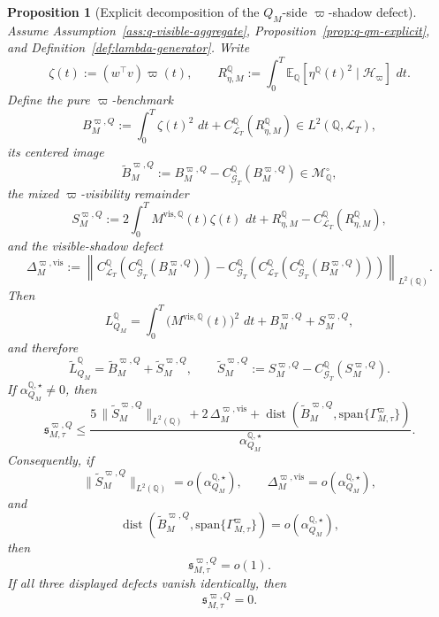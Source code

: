 \documentclass[11pt,a4paper]{amsart}
\theoremstyle{plain}
\newtheorem{proposition}[theorem]{Proposition}
\theoremstyle{definition}
\theoremstyle{remark}
\DeclareMathOperator{\dist}{dist}
\newcommand{\QQ}{\mathbb{Q}}
\newcommand{\EE}{\mathbb{E}}
\newcommand{\cG}{\mathcal{G}}
\newcommand{\cH}{\mathcal{H}}
\newcommand{\cL}{\mathcal{L}}
\newcommand{\cM}{\mathcal{M}}
\newcommand{\dd}{\,d}
\begin{document}
\begin{proposition}[Explicit decomposition of the \(Q_M\)-side \(\varpi\)-shadow defect]\label{prop:lambda-shadow-explicit}
Assume Assumption~\ref{ass:q-visible-aggregate}, Proposition~\ref{prop:q-qm-explicit}, and
Definition~\ref{def:lambda-generator}.  Write
\[
        \zeta(t):=(w^\top v)\varpi(t),
        \qquad
        R_{\eta,M}^\QQ
        :=
        \int_0^T \EE_\QQ[\eta^\QQ(t)^2\mid \cH_\varpi]\,\dd t.
\]
Define the pure \(\varpi\)-benchmark
\[
        B_{M}^{\varpi,Q}
        :=
        \int_0^T \zeta(t)^2\,\dd t
        +
        C_{\cL_T}^\QQ(R_{\eta,M}^\QQ)
        \in L^2(\QQ,\cL_T),
\]
its centered image
\[
        \widetilde B_{M}^{\varpi,Q}
        :=
        B_{M}^{\varpi,Q}
        -
        C_{\cG_T}^\QQ(B_{M}^{\varpi,Q})
        \in \cM_\QQ^\circ,
\]
the mixed \(\varpi\)-visibility remainder
\[
        S_{M}^{\varpi,Q}
        :=
        2\int_0^T M^{\mathrm{vis},\QQ}(t)\zeta(t)\,\dd t
        +
        R_{\eta,M}^\QQ
        -
        C_{\cL_T}^\QQ(R_{\eta,M}^\QQ),
\]
and the visible-shadow defect
\[
        \Delta_{M}^{\varpi,\mathrm{vis}}
        :=
        \left\|
                C_{\cL_T}^\QQ\!\left(
                        C_{\cG_T}^\QQ(B_{M}^{\varpi,Q})
                \right)
                -
                C_{\cG_T}^\QQ\!\left(
                        C_{\cL_T}^\QQ\!\left(
                                C_{\cG_T}^\QQ(B_{M}^{\varpi,Q})
                        \right)
                \right)
        \right\|_{L^2(\QQ)}.
\]
Then
\[
        L_{Q_M}^\QQ
        =
        \int_0^T \bigl(M^{\mathrm{vis},\QQ}(t)\bigr)^2\,\dd t
        +
        B_{M}^{\varpi,Q}
        +
        S_{M}^{\varpi,Q},
\]
and therefore
\[
        \widetilde L_{Q_M}^\QQ
        =
        \widetilde B_{M}^{\varpi,Q}
        +
        \widetilde S_{M}^{\varpi,Q},
        \qquad
        \widetilde S_{M}^{\varpi,Q}
        :=
        S_{M}^{\varpi,Q}
        -
        C_{\cG_T}^\QQ(S_{M}^{\varpi,Q}).
\]
If \(\alpha_{Q_M}^{\QQ,\star}\neq0\), then
\[
        \mathfrak s_{M,\tau}^{\varpi,Q}
        \le
        \frac{
                5\,\|\widetilde S_{M}^{\varpi,Q}\|_{L^2(\QQ)}
                +
                2\,\Delta_{M}^{\varpi,\mathrm{vis}}
                +
                \dist\!\left(
                        \widetilde B_{M}^{\varpi,Q},
                        \mathrm{span}\{\Gamma_{M,\tau}^\varpi\}
                \right)
        }{\alpha_{Q_M}^{\QQ,\star}}.
\]
Consequently, if
\[
        \|\widetilde S_{M}^{\varpi,Q}\|_{L^2(\QQ)}
        =
        o\!\left(\alpha_{Q_M}^{\QQ,\star}\right),
        \qquad
        \Delta_{M}^{\varpi,\mathrm{vis}}
        =
        o\!\left(\alpha_{Q_M}^{\QQ,\star}\right),
\]
and
\[
        \dist\!\left(
                \widetilde B_{M}^{\varpi,Q},
                \mathrm{span}\{\Gamma_{M,\tau}^\varpi\}
        \right)
        =
        o\!\left(\alpha_{Q_M}^{\QQ,\star}\right),
\]
then
\[
        \mathfrak s_{M,\tau}^{\varpi,Q}=o(1).
\]
If all three displayed defects vanish identically, then
\[
        \mathfrak s_{M,\tau}^{\varpi,Q}=0.
\]
\end{proposition}
\end{document}
